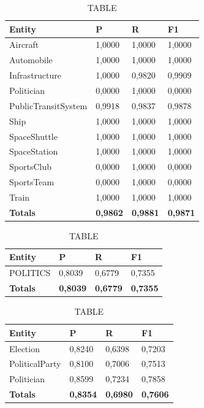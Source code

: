 \documentclass[thesis=M,english]{FITthesis}[2018/05/30]
\begin{document}
	\begin{table}[H]\centering
		\caption{TABLE}
		\label{}
		\begin{tabular}{|l|l|l|l|}
			\hline {\textbf{Entity}} & {\textbf{P}} & {\textbf{R}} & {\textbf{F1}}\\\hline
				Aircraft & 1,0000 & 1,0000 & 1,0000\\
				Automobile & 1,0000 & 1,0000 & 1,0000\\				
				Infrastructure & 1,0000 & 0,9820 & 0,9909\\
				Politician & 0,0000 & 1,0000 & 0,0000\\				
				PublicTransitSystem & 0,9918 & 0,9837 & 0,9878\\
				Ship & 1,0000 & 1,0000 & 1,0000\\				
				SpaceShuttle & 1,0000 & 1,0000 & 1,0000\\
				SpaceStation & 1,0000 & 1,0000 & 1,0000\\
				SportsClub & 0,0000 & 1,0000 & 0,0000\\
				SportsTeam & 0,0000 & 1,0000 & 0,0000\\
				Train & 1,0000 & 1,0000 & 1,0000\\\hline
				\textbf{Totals} & \textbf{0,9862} & \textbf{0,9881} & \textbf{0,9871}\\\hline
		\end{tabular}
	\end{table}		
	

	\begin{table}[H]\centering
		\caption{TABLE}
		\label{}
		\begin{tabular}{|l|l|l|l|}
			\hline {\textbf{Entity}} & {\textbf{P}} & {\textbf{R}} & {\textbf{F1}}\\\hline
				POLITICS & 0,8039 & 0,6779 & 0,7355\\\hline
				\textbf{Totals} & \textbf{0,8039} & \textbf{0,6779} & \textbf{0,7355}\\\hline
		\end{tabular}
	\end{table}

	\begin{table}[H]\centering
		\caption{TABLE}
		\label{}
		\begin{tabular}{|l|l|l|l|}
			\hline {\textbf{Entity}} & {\textbf{P}} & {\textbf{R}} & {\textbf{F1}}\\\hline
				Election & 0,8240 & 0,6398 & 0,7203\\
				PoliticalParty & 0,8100 & 0,7006 & 0,7513\\
				Politician & 0,8599 & 0,7234 & 0,7858\\\hline
				\textbf{Totals} & \textbf{0,8354} & \textbf{0,6980} & \textbf{0,7606}\\\hline
		\end{tabular}
	\end{table}	
	
\end{document}

